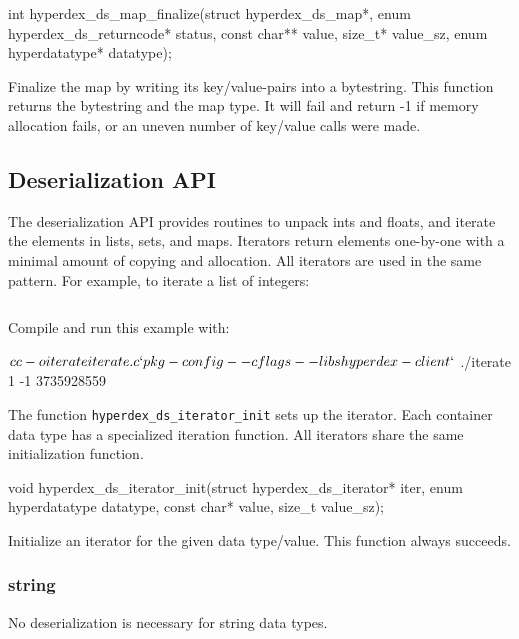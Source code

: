 \funcsep
\begin{ccode}
int hyperdex_ds_map_finalize(struct hyperdex_ds_map*,
                             enum hyperdex_ds_returncode* status,
                             const char** value, size_t* value_sz,
                             enum hyperdatatype* datatype);
\end{ccode}
\funcdesc Finalize the map by writing its key/value-pairs  into a bytestring.
This function returns the bytestring and the map type.  It will fail and return
-1 if memory allocation fails, or an uneven number of key/value calls were made.

\subsection{Deserialization API}

The deserialization API provides routines to unpack ints and floats, and iterate
the elements in lists, sets, and maps.  Iterators return elements one-by-one
with a minimal amount of copying and allocation.  All iterators are used in the
same pattern.  For example, to iterate a list of integers:

\inputminted{c}{api/c/iterate.c}

Compile and run this example with:

\begin{consolecode}
$ cc -o iterate iterate.c `pkg-config --cflags --libs hyperdex-client`
$ ./iterate
1
-1
3735928559
\end{consolecode}

The function \texttt{hyperdex\_ds\_iterator\_init} sets up the iterator.  Each
container data type has a specialized iteration function.  All iterators share
the same initialization function.

\begin{ccode}
void hyperdex_ds_iterator_init(struct hyperdex_ds_iterator* iter,
                               enum hyperdatatype datatype,
                               const char* value,
                               size_t value_sz);
\end{ccode}
\funcdesc Initialize an iterator for the given data type/value.  This function
always succeeds.

\subsubsection{string}

No deserialization is necessary for string data types.

